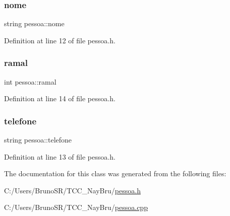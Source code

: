 \subsubsection{\texorpdfstring{nome}{nome}}
{\footnotesize\ttfamily string pessoa\+::nome}



Definition at line 12 of file pessoa.\+h.

\hypertarget{classpessoa_a3263ed9356bab20fb6c364483fe0d7b7}{}\label{classpessoa_a3263ed9356bab20fb6c364483fe0d7b7} 
\subsubsection{\texorpdfstring{ramal}{ramal}}
{\footnotesize\ttfamily int pessoa\+::ramal}



Definition at line 14 of file pessoa.\+h.

\hypertarget{classpessoa_aa73d0148299c1920e2ab238956a869ab}{}\label{classpessoa_aa73d0148299c1920e2ab238956a869ab} 
\subsubsection{\texorpdfstring{telefone}{telefone}}
{\footnotesize\ttfamily string pessoa\+::telefone}



Definition at line 13 of file pessoa.\+h.



The documentation for this class was generated from the following files\+:\begin{DoxyCompactItemize}
\item 
C\+:/\+Users/\+Bruno\+S\+R/\+T\+C\+C\+\_\+\+Nay\+Bru/\hyperlink{pessoa_8h}{pessoa.\+h}\item 
C\+:/\+Users/\+Bruno\+S\+R/\+T\+C\+C\+\_\+\+Nay\+Bru/\hyperlink{pessoa_8cpp}{pessoa.\+cpp}\end{DoxyCompactItemize}
